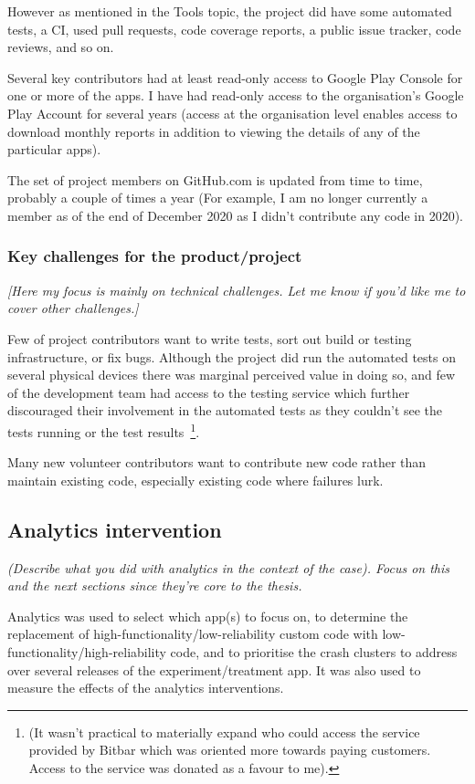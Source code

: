 However as mentioned in the Tools topic, the project did have some automated tests, a CI, used pull requests, code coverage reports, a public issue tracker, code reviews, and so on.

Several key contributors had at least read-only access to Google Play Console for one or more of the apps. I have had read-only access to the organisation’s Google Play Account for several years (access at the organisation level enables access to download monthly reports in addition to viewing the details of any of the particular apps).

The set of project members on GitHub.com is updated from time to time, probably a couple of times a year (For example, I am no longer currently a member as of the end of December 2020 as I didn’t contribute any code in 2020).

\subsubsection{Key challenges for the product/project}
\textit{[Here my focus is mainly on technical challenges. Let me know if you’d like me to cover other challenges.]}

Few of project contributors want to write tests, sort out build or testing infrastructure, or fix bugs. Although the project did run the automated tests on several physical devices there was marginal perceived value in doing so, and few of the development team had access to the testing service which further discouraged their involvement in the automated tests as they couldn't see the tests running or the test results~\footnote{(It wasn’t practical to materially expand who could access the service provided by Bitbar which was oriented more towards paying customers. Access to the service was donated as a favour to me).}.


Many new volunteer contributors want to contribute new code rather than maintain existing code, especially existing code where failures lurk. 

\subsection{Analytics intervention}
\textit{(Describe what you did with analytics in the context of the case). Focus on this and the next sections since they’re core to the thesis.}

Analytics was used to select which app(s) to focus on, to determine the replacement of high-functionality/low-reliability custom code with low-functionality/high-reliability code, and to prioritise the crash clusters to address over several releases of the experiment/treatment app. It was also used to measure the effects of the analytics interventions.

